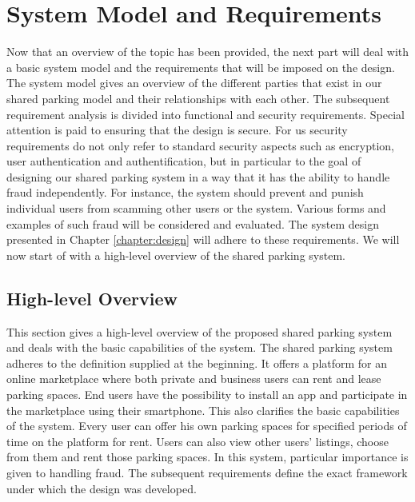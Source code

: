 \documentclass[
a4paper,     %
titlepage,   %
14pt         %
]{scrartcl}  %
\theoremstyle{mystyle}
\begin{document}
\section{System Model and Requirements}
Now that an overview of the topic has been provided, the next part will deal with a basic system model and the requirements that will be imposed on the design. The system model gives an overview of the different parties that exist in our shared parking model and their relationships with each other. The subsequent requirement analysis is divided into functional and security requirements. Special attention is paid to ensuring that the design is secure. For us security requirements do not only refer to standard security aspects such as encryption, user authentication and authentification, but in particular to the goal of designing our shared parking system in a way that it has the ability to handle fraud independently. For instance, the system should prevent and punish individual users from scamming other users or the system. Various forms and examples of such fraud will be considered and evaluated. The system design presented in Chapter \ref{chapter:design} will adhere to these requirements. We will now start of with a high-level overview of the shared parking system.

\subsection{High-level Overview}\label{High-level Overview}
This section gives a high-level overview of the proposed shared parking system and deals with the basic capabilities of the system. The shared parking system adheres to the definition supplied at the beginning. It offers a platform for an online marketplace where both private and business users can rent and lease parking spaces. End users have the possibility to install an app and participate in the marketplace using their smartphone. This also clarifies the basic capabilities of the system. Every user can offer his own parking spaces for specified periods of time on the platform for rent. Users can also view other users' listings, choose from them and rent those parking spaces. In this system, particular importance is given to handling fraud. The subsequent requirements define the exact framework under which the design was developed.
\end{document}
